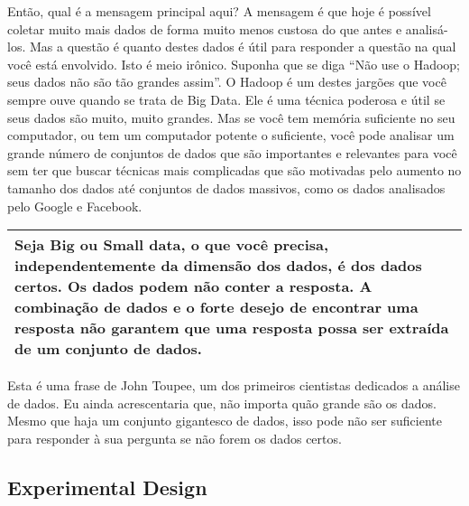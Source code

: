 \begin{multicols}{2}
\begin{footnotesize}
Então, qual é a mensagem principal aqui? A mensagem é que hoje é possível coletar muito mais dados de forma muito menos custosa do que antes e analisá-los. Mas a questão é quanto destes dados é útil para responder a questão na qual você está envolvido. Isto é meio irônico. Suponha que se diga ``Não use o Hadoop; seus dados não são tão grandes assim''. O Hadoop é um destes jargões que você sempre ouve quando se trata de Big Data. Ele é uma técnica poderosa e útil se seus dados são muito, muito grandes. Mas se você tem memória suficiente no seu computador, ou tem um computador potente o suficiente, você pode analisar um grande número de conjuntos de dados que são importantes e relevantes para você sem ter que buscar técnicas mais complicadas que são motivadas pelo aumento no tamanho dos dados até conjuntos de dados massivos, como os dados analisados pelo Google e Facebook. 
\end{footnotesize}
\end{multicols}

\begin{center}
\begin{tabular}{p{15cm}}
\hline
Seja Big ou Small data, o que você precisa, independentemente da dimensão dos dados, é dos dados certos. Os dados podem não conter a resposta. A combinação de dados e o forte desejo de encontrar uma resposta não garantem que uma resposta possa ser extraída de um conjunto de dados. \\
\hline
\end{tabular}
\end{center}

\begin{multicols}{2}
\begin{footnotesize}
Esta é uma frase de John Toupee, um dos primeiros cientistas dedicados a análise de dados. Eu ainda acrescentaria que, não importa quão grande são os dados. Mesmo que haja um conjunto gigantesco de dados, isso pode não ser suficiente para responder à sua pergunta se não forem os dados certos. 
\end{footnotesize}
\end{multicols}


\subsection{Experimental Design}

